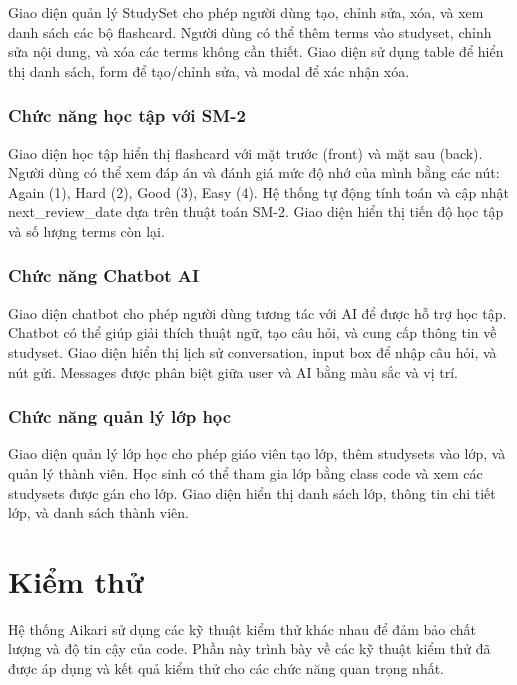 \documentclass[../DoAn.tex]{subfiles}
\begin{document}
Giao diện quản lý StudySet cho phép người dùng tạo, chỉnh sửa, xóa, và xem danh sách các bộ flashcard. Người dùng có thể thêm terms vào studyset, chỉnh sửa nội dung, và xóa các terms không cần thiết. Giao diện sử dụng table để hiển thị danh sách, form để tạo/chỉnh sửa, và modal để xác nhận xóa.

\subsubsection{Chức năng học tập với SM-2}

Giao diện học tập hiển thị flashcard với mặt trước (front) và mặt sau (back). Người dùng có thể xem đáp án và đánh giá mức độ nhớ của mình bằng các nút: Again (1), Hard (2), Good (3), Easy (4). Hệ thống tự động tính toán và cập nhật next\_review\_date dựa trên thuật toán SM-2. Giao diện hiển thị tiến độ học tập và số lượng terms còn lại.

\subsubsection{Chức năng Chatbot AI}

Giao diện chatbot cho phép người dùng tương tác với AI để được hỗ trợ học tập. Chatbot có thể giúp giải thích thuật ngữ, tạo câu hỏi, và cung cấp thông tin về studyset. Giao diện hiển thị lịch sử conversation, input box để nhập câu hỏi, và nút gửi. Messages được phân biệt giữa user và AI bằng màu sắc và vị trí.

\subsubsection{Chức năng quản lý lớp học}

Giao diện quản lý lớp học cho phép giáo viên tạo lớp, thêm studysets vào lớp, và quản lý thành viên. Học sinh có thể tham gia lớp bằng class code và xem các studysets được gán cho lớp. Giao diện hiển thị danh sách lớp, thông tin chi tiết lớp, và danh sách thành viên.

\section{Kiểm thử}
\label{section:4.4}

Hệ thống Aikari sử dụng các kỹ thuật kiểm thử khác nhau để đảm bảo chất lượng và độ tin cậy của code. Phần này trình bày về các kỹ thuật kiểm thử đã được áp dụng và kết quả kiểm thử cho các chức năng quan trọng nhất.
\end{document}
